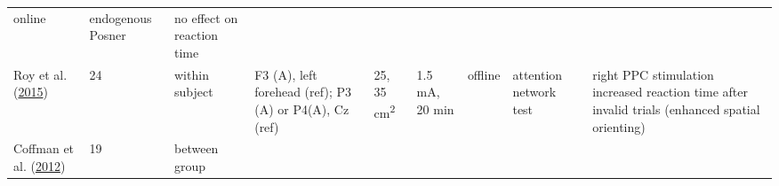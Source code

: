 \documentclass[11pt,]{memoir}
\begin{document}
\begin{longtable}[]{@{}lllllllll@{}}
\begin{minipage}[t]{0.05\columnwidth}
online\strut
\end{minipage} & \begin{minipage}[t]{0.11\columnwidth}\raggedright
endogenous Posner\strut
\end{minipage} & \begin{minipage}[t]{0.24\columnwidth}\raggedright
no effect on reaction time\strut
\end{minipage}\tabularnewline
\begin{minipage}[t]{0.12\columnwidth}\raggedright
Roy et al. (\protect\hyperlink{ref-Roy2015}{2015})\strut
\end{minipage} & \begin{minipage}[t]{0.02\columnwidth}\raggedright
24\strut
\end{minipage} & \begin{minipage}[t]{0.04\columnwidth}\raggedright
within
subject\strut
\end{minipage} & \begin{minipage}[t]{0.11\columnwidth}\raggedright
F3 (A), left forehead
(ref); P3 (A) or P4(A),
Cz (ref)\strut
\end{minipage} & \begin{minipage}[t]{0.03\columnwidth}\raggedright
25,
35
cm\textsuperscript{2}\strut
\end{minipage} & \begin{minipage}[t]{0.05\columnwidth}\raggedright
1.5 mA, 20
min\strut
\end{minipage} & \begin{minipage}[t]{0.05\columnwidth}\raggedright
offline\strut
\end{minipage} & \begin{minipage}[t]{0.11\columnwidth}\raggedright
attention network test\strut
\end{minipage} & \begin{minipage}[t]{0.24\columnwidth}\raggedright
right PPC stimulation increased reaction time after invalid
trials (enhanced spatial orienting)\strut
\end{minipage}\tabularnewline
\begin{minipage}[t]{0.12\columnwidth}\raggedright
Coffman et al. (\protect\hyperlink{ref-Coffman2012}{2012})\strut
\end{minipage} & \begin{minipage}[t]{0.02\columnwidth}\raggedright
19\strut
\end{minipage} & \begin{minipage}[t]{0.04\columnwidth}\raggedright
between
group\strut
\end{minipage} & \begin{minipage}[t]{0.11\columnwidth}\raggedright

\end{minipage}
\end{longtable}
\end{document}
